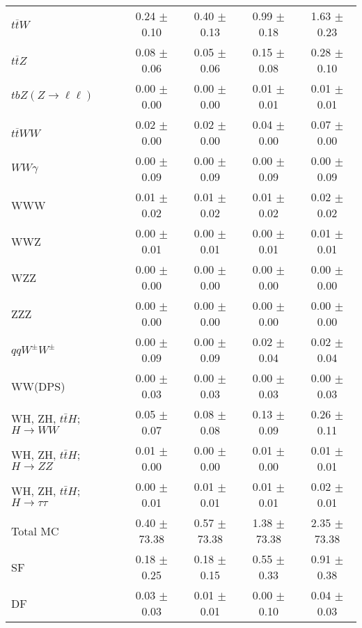 \begin{tabular}{l|cccc}
                   $t\overline{t}W$ &  0.24 $\pm$  0.10 &  0.40 $\pm$  0.13 &  0.99 $\pm$  0.18 &  1.63 $\pm$  0.23 \\
                   $t\overline{t}Z$ &  0.08 $\pm$  0.06 &  0.05 $\pm$  0.06 &  0.15 $\pm$  0.08 &  0.28 $\pm$  0.10 \\
    $tbZ (Z \rightarrow \ell \ell)$ &  0.00 $\pm$  0.00 &  0.00 $\pm$  0.00 &  0.01 $\pm$  0.01 &  0.01 $\pm$  0.01 \\
                  $t\overline{t}WW$ &  0.02 $\pm$  0.00 &  0.02 $\pm$  0.00 &  0.04 $\pm$  0.00 &  0.07 $\pm$  0.00 \\
                         $WW\gamma$ &  0.00 $\pm$  0.09 &  0.00 $\pm$  0.09 &  0.00 $\pm$  0.09 &  0.00 $\pm$  0.09 \\
                                WWW &  0.01 $\pm$  0.02 &  0.01 $\pm$  0.02 &  0.01 $\pm$  0.02 &  0.02 $\pm$  0.02 \\
                                WWZ &  0.00 $\pm$  0.01 &  0.00 $\pm$  0.01 &  0.00 $\pm$  0.01 &  0.01 $\pm$  0.01 \\
                                WZZ &  0.00 $\pm$  0.00 &  0.00 $\pm$  0.00 &  0.00 $\pm$  0.00 &  0.00 $\pm$  0.00 \\
                                ZZZ &  0.00 $\pm$  0.00 &  0.00 $\pm$  0.00 &  0.00 $\pm$  0.00 &  0.00 $\pm$  0.00 \\
                 $qqW^{\pm}W^{\pm}$ &  0.00 $\pm$  0.09 &  0.00 $\pm$  0.09 &  0.02 $\pm$  0.04 &  0.02 $\pm$  0.04 \\
                            WW(DPS) &  0.00 $\pm$  0.03 &  0.00 $\pm$  0.03 &  0.00 $\pm$  0.03 &  0.00 $\pm$  0.03 \\
WH, ZH, $t\bar{t}H$; $H \rightarrow WW$ &  0.05 $\pm$  0.07 &  0.08 $\pm$  0.08 &  0.13 $\pm$  0.09 &  0.26 $\pm$  0.11 \\
WH, ZH, $t\bar{t}H$; $H \rightarrow ZZ$ &  0.01 $\pm$  0.00 &  0.00 $\pm$  0.00 &  0.01 $\pm$  0.00 &  0.01 $\pm$  0.01 \\
WH, ZH, $t\bar{t}H$; $H \rightarrow \tau\tau$ &  0.00 $\pm$  0.01 &  0.01 $\pm$  0.01 &  0.01 $\pm$  0.01 &  0.02 $\pm$  0.01 \\
\hline\hline
                           Total MC &  0.40 $\pm$ 73.38 &  0.57 $\pm$ 73.38 &  1.38 $\pm$ 73.38 &  2.35 $\pm$ 73.38 \\
\hline
                                 SF &  0.18 $\pm$  0.25 &  0.18 $\pm$  0.15 &  0.55 $\pm$  0.33 &  0.91 $\pm$  0.38 \\
                                 DF &  0.03 $\pm$  0.03 &  0.01 $\pm$  0.01 &  0.00 $\pm$  0.10 &  0.04 $\pm$  0.03 \\

\end{tabular}
